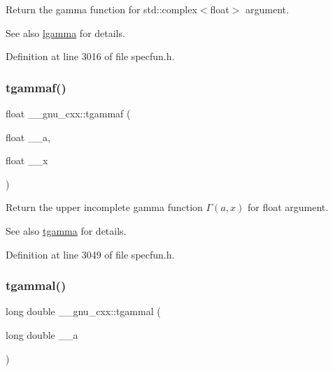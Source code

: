Return the gamma function for {\ttfamily  std\+::complex$<$float$>$ } argument.

\begin{DoxySeeAlso}{See also}
\hyperlink{group__gnu__math__spec__func_ga40fa5127f7c419ed1d8f1c6a6f96ea9b}{lgamma} for details. 
\end{DoxySeeAlso}


Definition at line 3016 of file specfun.\+h.

\mbox{\label{group__gnu__math__spec__func_ga942773871e9c21a50cf13ec160e7e8d9}} 
\subsubsection{\texorpdfstring{tgammaf()}{tgammaf()}\hspace{0.1cm}{\footnotesize\ttfamily [3/3]}}
{\footnotesize\ttfamily float \+\_\+\+\_\+gnu\+\_\+cxx\+::tgammaf (\begin{DoxyParamCaption}\item[{float}]{\+\_\+\+\_\+a,  }\item[{float}]{\+\_\+\+\_\+x }\end{DoxyParamCaption})\hspace{0.3cm}{\ttfamily [inline]}}

Return the upper incomplete gamma function $ \Gamma(a,x) $ for {\ttfamily float} argument.

\begin{DoxySeeAlso}{See also}
\hyperlink{group__gnu__math__spec__func_ga73a634663e4eceb1e6bcf3fc16773b7b}{tgamma} for details. 
\end{DoxySeeAlso}


Definition at line 3049 of file specfun.\+h.

\mbox{\label{group__gnu__math__spec__func_ga2c7d954852d84665aabd43566d67e344}} 
\subsubsection{\texorpdfstring{tgammal()}{tgammal()}\hspace{0.1cm}{\footnotesize\ttfamily [1/3]}}
{\footnotesize\ttfamily long double \+\_\+\+\_\+gnu\+\_\+cxx\+::tgammal (\begin{DoxyParamCaption}\item[{long double}]{\+\_\+\+\_\+a }\end{DoxyParamCaption})\hspace{0.3cm}{\ttfamily [inline]}}

